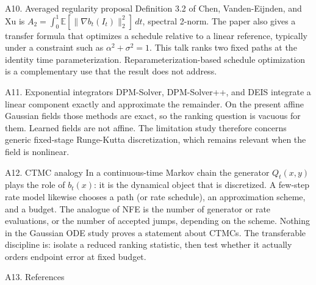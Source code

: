 \documentclass[aspectratio=169,10pt,c]{beamer}
\newcommand{\citefoot}[1]{{\tiny\color{fsgray}\citep{#1}}}
\begin{document}
\begin{frame}{A10. Averaged regularity proposal}
  \small
  Definition 3.2 of Chen, Vanden-Eijnden, and Xu is
  \(A_2=\int_0^1 \mathbb{E}[\|\nabla b_t(I_t)\|_2^2]\,dt\), spectral 2-norm.
  The paper also gives a transfer formula that optimizes a schedule
  relative to a linear reference, typically under a constraint such as
  \(\alpha^2+\sigma^2=1\).
  This talk ranks two fixed paths at the identity time parameterization.
  Reparameterization-based schedule optimization is a complementary use that
  the result does not address.
  \citefoot{lipschitzguided2025}
\end{frame}

\begin{frame}{A11. Exponential integrators}
  \small
  DPM-Solver, DPM-Solver++, and DEIS integrate a linear component exactly
  and approximate the remainder.
  On the present affine Gaussian fields those methods are exact, so the
  ranking question is vacuous for them.
  Learned fields are not affine. The limitation study therefore concerns
  generic fixed-stage Runge-Kutta discretization, which remains relevant
  when the field is nonlinear.
  \citefoot{lu2022dpmsolver,lu2022dpmsolverpp,zhang2023deis}
\end{frame}

\begin{frame}{A12. CTMC analogy}
  \small
  In a continuous-time Markov chain the generator \(Q_t(x,y)\) plays the role
  of \(b_t(x)\): it is the dynamical object that is discretized.
  A few-step rate model likewise chooses a path (or rate schedule), an
  approximation scheme, and a budget.
  The analogue of NFE is the number of generator or rate evaluations,
  or the number of accepted jumps, depending on the scheme.
  Nothing in the Gaussian ODE study proves a statement about CTMCs.
  The transferable discipline is: isolate a reduced ranking statistic,
  then test whether it actually orders endpoint error at fixed budget.
\end{frame}

\begin{frame}[allowframebreaks]{A13. References}
  \tiny
  
\end{frame}
\end{document}
